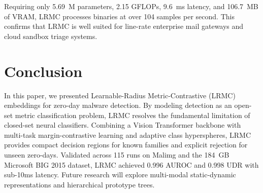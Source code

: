 \documentclass[conference]{IEEEtran}
\begin{document}
Requiring only 5.69~M parameters, 2.15 GFLOPs, 9.6~ms latency, and 106.7~MB of VRAM, LRMC processes binaries at over 104 samples per second. This confirms that LRMC is well suited for line-rate enterprise mail gateways and cloud sandbox triage systems.

\section{Conclusion}
In this paper, we presented Learnable-Radius Metric-Contrastive (LRMC) embeddings for zero-day malware detection. By modeling detection as an open-set metric classification problem, LRMC resolves the fundamental limitation of closed-set neural classifiers. Combining a Vision Transformer backbone with multi-task margin-contrastive learning and adaptive class hyperspheres, LRMC provides compact decision regions for known families and explicit rejection for unseen zero-days. Validated across 115 runs on Malimg and the 184~GB Microsoft BIG 2015 dataset, LRMC achieved 0.996 AUROC and 0.998 UDR with sub-10ms latency. Future research will explore multi-modal static-dynamic representations and hierarchical prototype trees.



\end{document}
